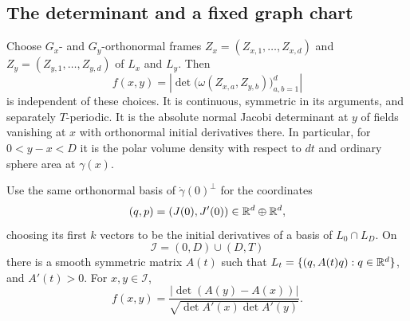 \subsection{The determinant and a fixed graph chart}

\begin{proposition}
\label{lag:determinant}
Choose $G_x$- and $G_y$-orthonormal frames
$Z_x=(Z_{x,1},\ldots,Z_{x,d})$ and
$Z_y=(Z_{y,1},\ldots,Z_{y,d})$ of $L_x$ and $L_y$.  Then
\begin{equation}
 f(x,y)=\left|\det\bigl(\omega(Z_{x,a},Z_{y,b})\bigr)_{a,b=1}^d\right|
 \label{eq:lag-f}
\end{equation}
is independent of these choices.  It is continuous, symmetric in its
arguments, and separately $T$-periodic.  It is the absolute normal
Jacobi determinant at $y$ of fields vanishing at $x$ with orthonormal
initial derivatives there.  In particular, for $0<y-x<D$ it is the
polar volume density with respect to $dt$ and ordinary sphere area at
$\gamma(x)$.

Use the same orthonormal basis of $\dot\gamma(0)^\perp$ for the
coordinates
\[
 (q,p)=(J(0),J'(0))\in\mathbb R^d\oplus\mathbb R^d,
\]
choosing its first $k$ vectors to be the initial derivatives of a basis
of $L_0\cap L_D$.  On
\[
 \mathcal I=(0,D)\cup(D,T)
\]
there is a smooth symmetric matrix $A(t)$ such that
$L_t=\{(q,A(t)q):q\in\mathbb R^d\}$, and $A'(t)>0$.  For $x,y\in\mathcal I$,
\begin{equation}
 f(x,y)=
 \frac{|\det(A(y)-A(x))|}
 {\sqrt{\det A'(x)\det A'(y)}}.
 \label{eq:lag-graph-determinant}
\end{equation}
\end{proposition}

